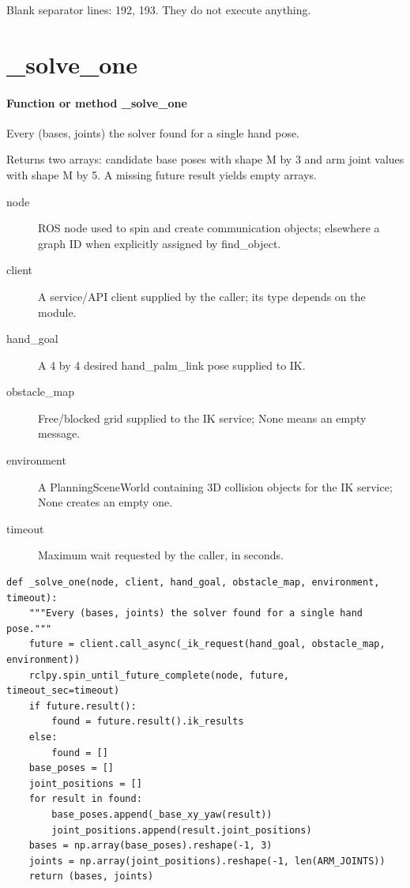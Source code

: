 \documentclass[11pt,a4paper]{book}
\begin{document}
Blank separator lines: 192, 193. They do not execute anything.

\section{\_solve\_one}

\paragraph{Function or method \_solve\_one}
Every (bases, joints) the solver found for a single hand pose.

Returns two arrays: candidate base poses with shape M by 3 and arm joint values with shape M by 5. A missing future result yields empty arrays.

\begin{description}
\item[node] ROS node used to spin and create communication objects; elsewhere a graph ID when explicitly assigned by find\_object.
\item[client] A service/API client supplied by the caller; its type depends on the module.
\item[hand\_goal] A 4 by 4 desired hand\_palm\_link pose supplied to IK.
\item[obstacle\_map] Free/blocked grid supplied to the IK service; None means an empty message.
\item[environment] A PlanningSceneWorld containing 3D collision objects for the IK service; None creates an empty one.
\item[timeout] Maximum wait requested by the caller, in seconds.
\end{description}

\begin{lstlisting}[firstnumber=194]
def _solve_one(node, client, hand_goal, obstacle_map, environment, timeout):
    """Every (bases, joints) the solver found for a single hand pose."""
    future = client.call_async(_ik_request(hand_goal, obstacle_map, environment))
    rclpy.spin_until_future_complete(node, future, timeout_sec=timeout)
    if future.result():
        found = future.result().ik_results
    else:
        found = []
    base_poses = []
    joint_positions = []
    for result in found:
        base_poses.append(_base_xy_yaw(result))
        joint_positions.append(result.joint_positions)
    bases = np.array(base_poses).reshape(-1, 3)
    joints = np.array(joint_positions).reshape(-1, len(ARM_JOINTS))
    return (bases, joints)


\end{lstlisting}
\end{document}
